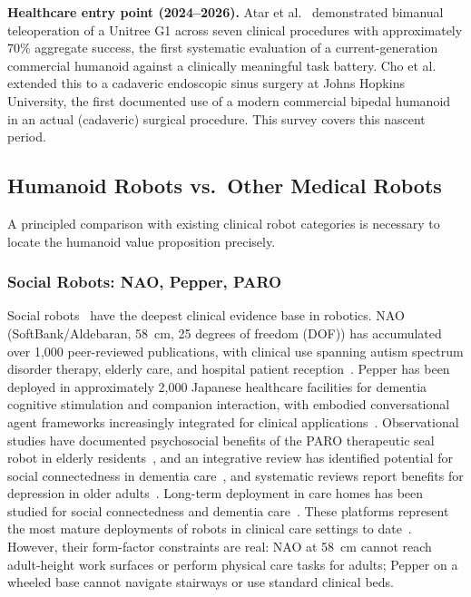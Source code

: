 \textbf{Healthcare entry point (2024--2026).} Atar et al.~\cite{atar2025humanoids}
demonstrated bimanual teleoperation of a Unitree G1 across seven clinical
procedures with approximately 70\% aggregate success, the first systematic
evaluation of a current-generation commercial humanoid against a clinically
meaningful task battery. Cho et al.~\cite{cho2026humanoid} extended this to a
cadaveric endoscopic sinus surgery at Johns Hopkins University, the first
documented use of a modern commercial bipedal humanoid in an actual (cadaveric)
surgical procedure. This survey covers this nascent period.

\subsection{Humanoid Robots vs.\ Other Medical Robots}
\label{sec:alternatives}

A principled comparison with existing clinical robot categories is necessary to
locate the humanoid value proposition precisely.

\subsubsection{Social Robots: NAO, Pepper, PARO}

Social robots~\cite{fong2003survey,dautenhahn2007socially} have the deepest
clinical evidence base in robotics. NAO
(SoftBank/Aldebaran, 58~cm, 25 degrees of freedom (DOF)) has accumulated over
1,000 peer-reviewed
publications, with clinical use spanning autism spectrum disorder therapy,
elderly care, and hospital patient reception~\cite{cabibihan2013robots}. Pepper
has been deployed in approximately 2,000 Japanese healthcare facilities for
dementia cognitive stimulation and companion interaction, with embodied
conversational agent frameworks increasingly integrated for clinical
applications~\cite{provoost2017embodied,sorensen2025humanoid,cunha2025humanoid}.
Observational studies have documented psychosocial benefits of the PARO therapeutic
seal robot in elderly residents~\cite{wada2007living}, and an integrative review
has identified potential for social connectedness in dementia
care~\cite{moyle2017telepresence}, and systematic reviews report benefits for
depression in older adults~\cite{chen2018social}. Long-term deployment in care homes has been
studied for social connectedness and dementia care~\cite{moyle2014dementia}.
These platforms represent the most mature deployments of robots in clinical care
settings to date~\cite{abdi2018scoping}. However, their form-factor constraints are real: NAO at 58~cm cannot
reach adult-height work surfaces or perform physical care tasks for adults; Pepper
on a wheeled base cannot navigate stairways or use standard clinical beds.

